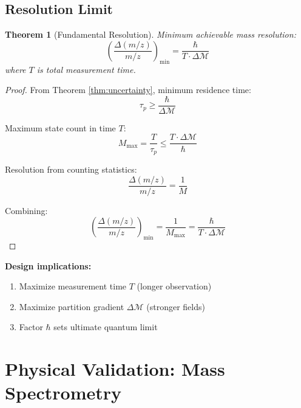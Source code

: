 \documentclass[twocolumn,10pt]{revtex4-2}
\newtheorem{theorem}{Theorem}[section]
\theoremstyle{definition}
\theoremstyle{remark}
\newcommand{\Mdepth}{\mathcal{M}}
\newcommand{\taup}{\tau_p}
\begin{document}
\subsection{Resolution Limit}

\begin{theorem}[Fundamental Resolution]
\label{thm:resolution}
Minimum achievable mass resolution:
\begin{equation}
\boxed{\left(\frac{\Delta(m/z)}{m/z}\right)_{\min} = \frac{\hbar}{T \cdot \Delta\Mdepth}}
\label{eq:resolution_limit}
\end{equation}
where $T$ is total measurement time.
\end{theorem}

\begin{proof}
From Theorem \ref{thm:uncertainty}, minimum residence time:
\begin{equation}
\taup \geq \frac{\hbar}{\Delta\Mdepth}
\end{equation}

Maximum state count in time $T$:
\begin{equation}
M_{\max} = \frac{T}{\taup} \leq \frac{T \cdot \Delta\Mdepth}{\hbar}
\label{eq:max_states}
\end{equation}

Resolution from counting statistics:
\begin{equation}
\frac{\Delta(m/z)}{m/z} = \frac{1}{M}
\label{eq:counting_resolution}
\end{equation}

Combining:
\begin{equation}
\left(\frac{\Delta(m/z)}{m/z}\right)_{\min} = \frac{1}{M_{\max}} = \frac{\hbar}{T \cdot \Delta\Mdepth}
\end{equation}
\end{proof}

\noindent\textbf{Design implications:}
\begin{enumerate}
\item Maximize measurement time $T$ (longer observation)
\item Maximize partition gradient $\Delta\Mdepth$ (stronger fields)
\item Factor $\hbar$ sets ultimate quantum limit
\end{enumerate}

\section{Physical Validation: Mass Spectrometry}
\label{sec:mass_spec_validation}
\end{document}
